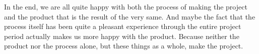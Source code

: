 In the end, we are all quite happy with both the process of making the project and the product that is the result of the very same. And maybe the fact that the process itself has been quite a pleasant experience through the entire project period actually makes us more happy with the product. Because neither the product nor the process alone, but these things as a whole, make the project.